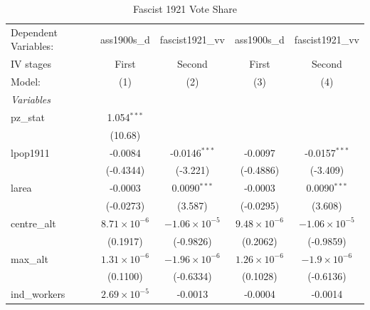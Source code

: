 
\begin{table}[htbp]
   \caption{Fascist 1921 Vote Share}
   \centering
   \begin{tabular}{lcccc}
      \tabularnewline \midrule \midrule
      Dependent Variables:             & ass1900s\_d           & fascist1921\_vv        & ass1900s\_d           & fascist1921\_vv\\   
      IV stages                        & First                 & Second                 & First                 & Second \\   
      Model:                           & (1)                   & (2)                    & (3)                   & (4)\\  
      \midrule
      \emph{Variables}\\
      pz\_stat                         & 1.054$^{***}$         &                        &                       &   \\   
                                       & (10.68)               &                        &                       &   \\   
      lpop1911                         & -0.0084               & -0.0146$^{***}$        & -0.0097               & -0.0157$^{***}$\\   
                                       & (-0.4344)             & (-3.221)               & (-0.4886)             & (-3.409)\\   
      larea                            & -0.0003               & 0.0090$^{***}$         & -0.0003               & 0.0090$^{***}$\\   
                                       & (-0.0273)             & (3.587)                & (-0.0295)             & (3.608)\\   
      centre\_alt                      & $8.71\times 10^{-6}$  & $-1.06\times 10^{-5}$  & $9.48\times 10^{-6}$  & $-1.06\times 10^{-5}$\\    
                                       & (0.1917)              & (-0.9826)              & (0.2062)              & (-0.9859)\\   
      max\_alt                         & $1.31\times 10^{-6}$  & $-1.96\times 10^{-6}$  & $1.26\times 10^{-6}$  & $-1.9\times 10^{-6}$\\    
                                       & (0.1100)              & (-0.6334)              & (0.1028)              & (-0.6136)\\   
      ind\_workers                     & $2.69\times 10^{-5}$  & -0.0013                & -0.0004               & -0.0014\\   

\end{tabular}
\end{table}
